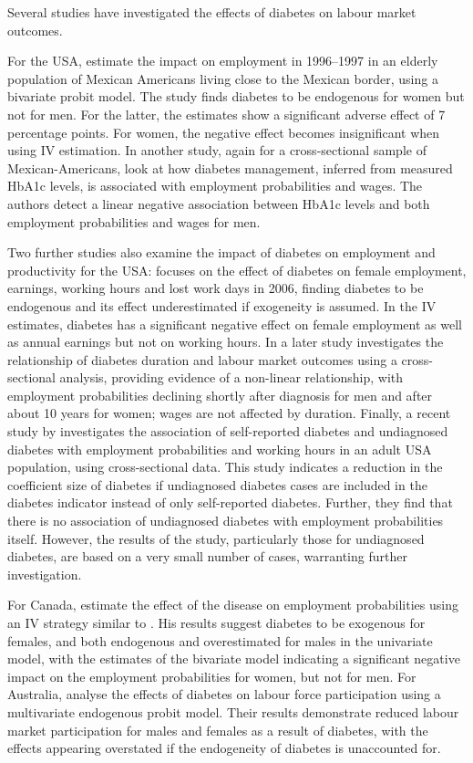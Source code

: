 Several studies have investigated the effects of diabetes on labour market outcomes. 

For the USA, \textcite{Brown2005} estimate  the impact on employment in 1996--1997 in an elderly population of Mexican Americans living close to the Mexican border, using a bivariate probit model. The study finds diabetes to be endogenous for women but not for men.  For the latter, the estimates show a significant adverse effect of 7 percentage points. For women, the negative effect becomes insignificant when using \ac{IV} estimation. In another study, again for a cross-sectional sample of  Mexican-Americans, \textcite{BrownIII2011} look at how diabetes management, inferred from measured \ac{HbA1c} levels, is associated with employment probabilities and wages. The authors detect a linear negative association between \ac{HbA1c} levels and both employment probabilities and wages for men. 

Two further studies also examine the impact of diabetes on employment and productivity for the USA: \textcite{Minor2011} focuses on the effect of diabetes on female employment, earnings, working hours and lost work days in 2006, finding diabetes to be endogenous and its effect underestimated if exogeneity is assumed. In the \ac{IV} estimates, diabetes has a significant negative effect on female employment as well as annual earnings but not on working hours. In a later study \textcite{Minor2013} investigates the relationship of diabetes duration and labour market outcomes using a cross-sectional analysis, providing evidence of a non-linear relationship, with employment probabilities declining shortly after diagnosis for men and after about 10 years for women; wages are not affected by duration. Finally, a recent study by \textcite{Minor2015} investigates the association of self-reported diabetes and undiagnosed diabetes with employment probabilities and working hours in an adult USA population, using cross-sectional data. This study indicates a reduction in the coefficient size of diabetes if undiagnosed diabetes cases are included in the diabetes indicator instead of only self-reported diabetes. Further, they find that there is no association of undiagnosed diabetes with employment probabilities itself. However, the results of the study, particularly those for undiagnosed diabetes, are based on a very small number of cases, warranting further investigation.

For Canada, \textcite{Latif2009} estimate the effect of the disease on employment probabilities using an \ac{IV} strategy similar to \textcite{Brown2005}. His results suggest diabetes to be exogenous for females, and both endogenous and overestimated for males in the univariate model, with the estimates of the bivariate model indicating a significant negative impact on the employment probabilities for women, but not for men. For Australia, \textcite{Zhang2009} analyse the effects of diabetes on labour force participation using a multivariate endogenous probit model. Their results demonstrate reduced labour market participation for males and females as a result of diabetes, with the effects appearing overstated if the endogeneity of diabetes is unaccounted for. 

